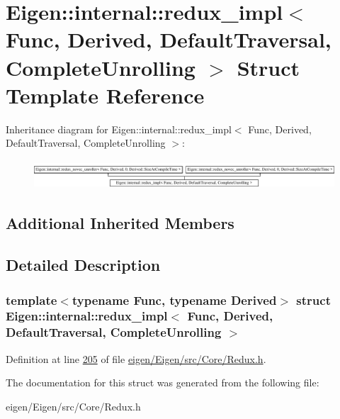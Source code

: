 \hypertarget{struct_eigen_1_1internal_1_1redux__impl_3_01_func_00_01_derived_00_01_default_traversal_00_01_complete_unrolling_01_4}{}\section{Eigen\+:\+:internal\+:\+:redux\+\_\+impl$<$ Func, Derived, Default\+Traversal, Complete\+Unrolling $>$ Struct Template Reference}
\label{struct_eigen_1_1internal_1_1redux__impl_3_01_func_00_01_derived_00_01_default_traversal_00_01_complete_unrolling_01_4}
Inheritance diagram for Eigen\+:\+:internal\+:\+:redux\+\_\+impl$<$ Func, Derived, Default\+Traversal, Complete\+Unrolling $>$\+:\begin{figure}[H]
\begin{center}
\leavevmode
\includegraphics[height=1.074856cm]{struct_eigen_1_1internal_1_1redux__impl_3_01_func_00_01_derived_00_01_default_traversal_00_01_complete_unrolling_01_4}
\end{center}
\end{figure}
\subsection*{Additional Inherited Members}


\subsection{Detailed Description}
\subsubsection*{template$<$typename Func, typename Derived$>$\newline
struct Eigen\+::internal\+::redux\+\_\+impl$<$ Func, Derived, Default\+Traversal, Complete\+Unrolling $>$}



Definition at line \hyperlink{eigen_2_eigen_2src_2_core_2_redux_8h_source_l00205}{205} of file \hyperlink{eigen_2_eigen_2src_2_core_2_redux_8h_source}{eigen/\+Eigen/src/\+Core/\+Redux.\+h}.



The documentation for this struct was generated from the following file\+:\begin{DoxyCompactItemize}
\item 
eigen/\+Eigen/src/\+Core/\+Redux.\+h\end{DoxyCompactItemize}
